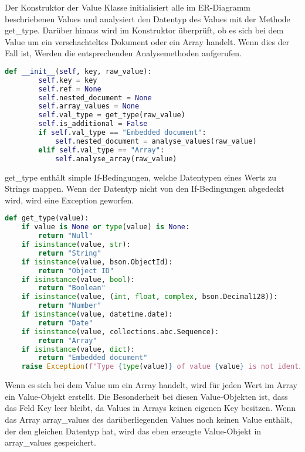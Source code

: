 Der Konstruktor der Value Klasse initialisiert alle im ER-Diagramm beschriebenen Values und analysiert den Datentyp des Values mit der Methode get\_type.
Darüber hinaus wird im Konstruktor überprüft, ob es sich bei dem Value um ein verschachteltes Dokument oder ein Array handelt. 
Wenn dies der Fall ist, Werden die entsprechenden Analysemethoden aufgerufen.

\begin{lstlisting}[language=python, caption={Value.\_\_init\_\_},label={lst:backend_value_init}]
    def __init__(self, key, raw_value):
        self.key = key
        self.ref = None
        self.nested_document = None
        self.array_values = None
        self.val_type = get_type(raw_value)
        self.is_additional = False
        if self.val_type == "Embedded document":
            self.nested_document = analyse_values(raw_value)
        elif self.val_type == "Array":
            self.analyse_array(raw_value)
\end{lstlisting}

get\_type enthält simple If-Bedingungen, welche Datentypen eines Werts zu Strings mappen.
Wenn der Datentyp nicht von den If-Bedingungen abgedeckt wird, wird eine Exception geworfen.

\begin{lstlisting}[language=python, caption={Value.get\_type},label={lst:backend_value_get_type}]
def get_type(value):
    if value is None or type(value) is None:
        return "Null"
    if isinstance(value, str):
        return "String"
    if isinstance(value, bson.ObjectId):
        return "Object ID"
    if isinstance(value, bool):
        return "Boolean"
    if isinstance(value, (int, float, complex, bson.Decimal128)):
        return "Number"
    if isinstance(value, datetime.date):
        return "Date"
    if isinstance(value, collections.abc.Sequence):
        return "Array"
    if isinstance(value, dict):
        return "Embedded document"
    raise Exception(f"Type {type(value)} of value {value} is not identifiable!")
\end{lstlisting}


Wenn es sich bei dem Value um ein Array handelt, wird für jeden Wert im Array ein Value-Objekt erstellt.
Die Besonderheit bei diesen Value-Objekten ist, dass das Feld Key leer bleibt, da Values in Arrays keinen eigenen Key besitzen.
Wenn das Array array\_values des darüberliegenden Values noch keinen Value enthält, der den gleichen Datentyp hat, wird das eben erzeugte Value-Objekt in array\_values gespeichert.

